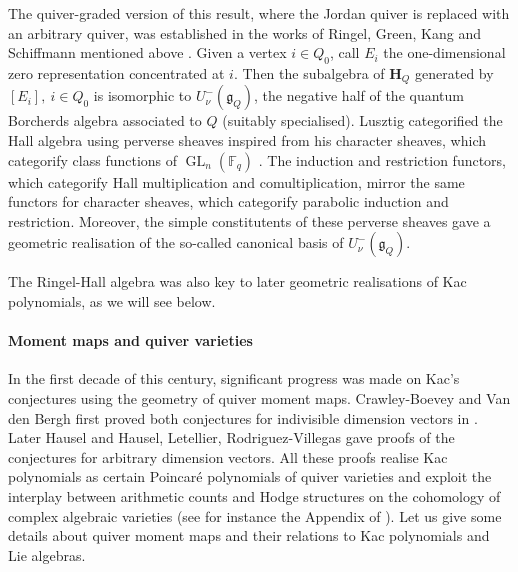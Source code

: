 \documentclass[11pt,english]{article}
\numberwithin{equation}{section}
\numberwithin{figure}{section}
\theoremstyle{definition}
\theoremstyle{plain}
\theoremstyle{remark}
\DeclareMathOperator{\GL}{GL}
\newcommand\FF{\mathbb{F}}
\begin{document}
The quiver-graded version of this result, where the Jordan quiver
is replaced with an arbitrary quiver, was established in the works
of Ringel, Green, Kang and Schiffmann mentioned above \cite{Rin90a,Gre95,KS06}.
Given a vertex $i\in Q_{0}$, call $E_{i}$ the one-dimensional zero
representation concentrated at $i$. Then the subalgebra of $\mathbf{H}_{Q}$
generated by $[E_{i}],\ i\in Q_{0}$ is isomorphic to $U_{\nu}^{-}(\mathfrak{g}_{Q})$,
the negative half of the quantum Borcherds algebra associated to $Q$
(suitably specialised). Lusztig categorified the Hall algebra using
perverse sheaves inspired from his character sheaves, which categorify
class functions of $\GL_{n}(\FF_{q})$ \cite{Lus85a,Lus91}. The induction
and restriction functors, which categorify Hall multiplication and
comultiplication, mirror the same functors for character sheaves,
which categorify parabolic induction and restriction. Moreover, the
simple constitutents of these perverse sheaves gave a geometric realisation
of the so-called canonical basis of $U_{\nu}^{-}(\mathfrak{g}_{Q})$.

The Ringel-Hall algebra was also key to later geometric realisations
of Kac polynomials, as we will see below.

\paragraph*{Moment maps and quiver varieties}

In the first decade of this century, significant progress was made
on Kac's conjectures using the geometry of quiver moment maps. Crawley-Boevey
and Van den Bergh first proved both conjectures for indivisible dimension
vectors in \cite{CBVB04}. Later Hausel \cite{Hau10} and Hausel,
Letellier, Rodriguez-Villegas \cite{HLRV13b} gave proofs of the conjectures
for arbitrary dimension vectors. All these proofs realise Kac polynomials
as certain Poincaré polynomials of quiver varieties and exploit the
interplay between arithmetic counts and Hodge structures on the cohomology
of complex algebraic varieties (see for instance the Appendix of \cite{HRV08}).
Let us give some details about quiver moment maps and their relations
to Kac polynomials and Lie algebras.
\end{document}
